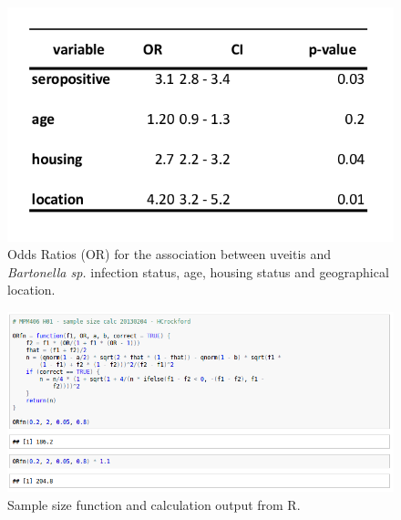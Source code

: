 \documentclass[11pt,twocolumn]{article}
\begin{document}
\begin{figure}[h!]
	\centering
	\includegraphics[scale=0.5]{table2.jpg}
	\caption{Odds Ratios (OR) for the association between uveitis and \emph{Bartonella sp.} infection status, age, housing status and geographical location.}
	\label{tab:2}
\end{figure}

\begin{figure}[h!]
	\centering
	\includegraphics[scale=0.5]{samplesizecalc.jpg}
	\caption{Sample size function and calculation output from R.}
	\label{fig:samplesizecalc}
\end{figure}

\clearpage


\end{document}

